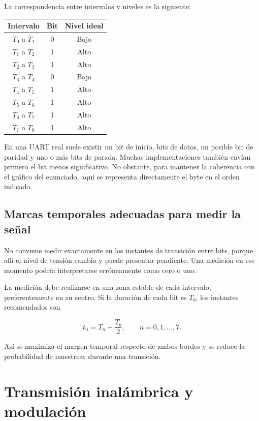 \documentclass[12pt,a4paper]{article}
\begin{document}
La correspondencia entre intervalos y niveles es la siguiente:

\begin{table}[H]
\centering
\begin{tabular}{ccc}
\toprule
Intervalo & Bit & Nivel ideal \\
\midrule
$T_0$ a $T_1$ & 0 & Bajo \\
$T_1$ a $T_2$ & 1 & Alto \\
$T_2$ a $T_3$ & 1 & Alto \\
$T_3$ a $T_4$ & 0 & Bajo \\
$T_4$ a $T_5$ & 1 & Alto \\
$T_5$ a $T_6$ & 1 & Alto \\
$T_6$ a $T_7$ & 1 & Alto \\
$T_7$ a $T_8$ & 1 & Alto \\
\bottomrule
\end{tabular}
\end{table}

En una UART real suele existir un bit de inicio, bits de datos, un posible bit
de paridad y uno o más bits de parada. Muchas implementaciones también envían
primero el bit menos significativo. No obstante, para mantener la coherencia
con el gráfico del enunciado, aquí se representa directamente el byte en el
orden indicado.

\subsection{Marcas temporales adecuadas para medir la señal}

No conviene medir exactamente en los instantes de transición entre bits, porque
allí el nivel de tensión cambia y puede presentar pendiente. Una medición en ese
momento podría interpretarse erróneamente como cero o uno.

La medición debe realizarse en una zona estable de cada intervalo,
preferentemente en su centro. Si la duración de cada bit es $T_b$, los instantes
recomendados son

\[
t_n=T_n+\frac{T_b}{2},\qquad n=0,1,\ldots,7.
\]

Así se maximiza el margen temporal respecto de ambos bordes y se reduce la
probabilidad de muestrear durante una transición.

\section{Transmisión inalámbrica y modulación}
\end{document}
